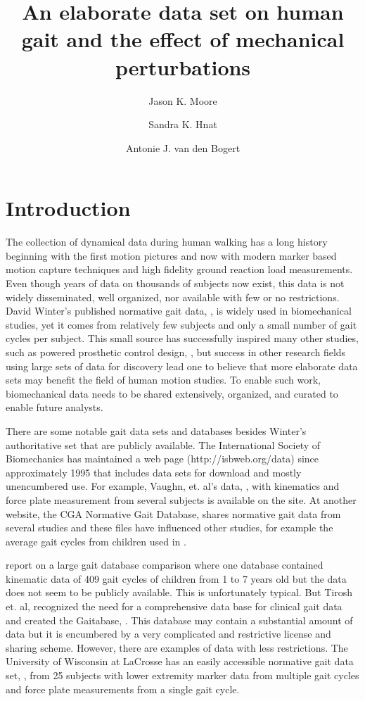 \documentclass[fleqn,12pt]{wlpeerj}
\title{An elaborate data set on human gait and the effect of mechanical
  perturbations}
\author[1]{Jason K. Moore}
\author[1]{Sandra K. Hnat}
\author[1]{Antonie J. van den Bogert}
\affil[1]{Mechanical Engineering, Cleveland State University, Cleveland, Ohio,
  USA, 44115. j.k.moore19@csuohio.edu, s.hnat@vikes.csuohio.edu,
  a.vandenbogert@csuohio.edu}
\begin{document}
\flushbottom
\maketitle
\thispagestyle{empty}

\section*{Introduction}
%
The collection of dynamical data during human walking has a long history
beginning with the first motion pictures and now with modern marker based
motion capture techniques and high fidelity ground reaction load measurements.
Even though years of data on thousands of subjects now exist, this data is not
widely disseminated, well organized, nor available with few or no restrictions.
David Winter's published normative gait data, \cite{Winter1990}, is widely used
in biomechanical studies, yet it comes from relatively few subjects and only a
small number of gait cycles per subject. This small source has successfully
inspired many other studies, such as powered prosthetic control
design, \cite{Sup2008}, but success in other research fields using large sets
of data for discovery lead one to believe that more elaborate data sets may
benefit the field of human motion studies. To enable such work, biomechanical
data needs to be shared extensively, organized, and curated to enable future
analysts.

There are some notable gait data sets and databases besides Winter's
authoritative set that are publicly available. The International Society of
Biomechanics has maintained a web page (http://isbweb.org/data) since
approximately 1995 that includes data sets for download and mostly unencumbered
use. For example, Vaughn, et. al's data, \cite{Vaughan1992}, with kinematics
and force plate measurement from several subjects is available on the site. At
another website, the CGA Normative Gait Database, \cite{Kirtley2014} shares
normative gait data from several studies and these files have influenced other
studies, for example the average gait cycles from children used in
\cite{Bogert2003}.

\cite{Chester2007} report on a large gait database comparison where one
database contained kinematic data of 409 gait cycles of children from 1 to 7
years old but the data does not seem to be publicly available. This is
unfortunately typical. But Tirosh et. al, recognized the need for a
comprehensive data base for clinical gait data and created the Gaitabase,
\cite{Tirosh2010}. This database may contain a substantial amount of data but
it is encumbered by a very complicated and restrictive license and sharing
scheme. However, there are examples of data with less restrictions. The
University of Wisconsin at LaCrosse has an easily accessible normative gait
data set, \cite{Willson2014}, from 25 subjects with lower extremity marker data
from multiple gait cycles and force plate measurements from a single gait
cycle.
\end{document}
